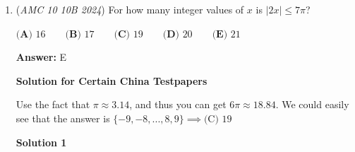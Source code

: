 \begin{enumerate}
Factoring out $7!$ gives 
 \[7!(10\cdot9\cdot8-1\cdot6!).\] Since $10\cdot9\cdot8=6!=720$, the answer is $\boxed{\text{(B) }0}$ 

 Factoring $6!$ also works, it just makes the expression in the parenthesis a little harder to compute.

 



\textbf{Solution 3}

Note that $10! - 7! \cdot 6!$ must be divisible by $7$, since 
 \[10! - 7! \cdot 6!=7!(10\cdot9\cdot8\cdot6!)=7\cdot(6!\cdot10\cdot9\cdot8\cdot6!)\] and $\boxed{\text{(B) }0}$ is the only option divisible by $7$.

 



\textbf{Solution 4}

$10! - 7! \cdot 6!$ can be split into two parts, $10!$ and $7! \cdot 6!$. We can break the $6!$ into $(2 \cdot 4)(3 \cdot 5 \cdot 6)$The $2 \cdot 4$ part makes $8$, and the $3 \cdot 5 \cdot 6$ part makes $90$, which is $9 \cdot 10$. We still have the 7!, and we can multiply it by $8 \cdot 9 \cdot 10$. This is clearly equivalent to $10!$, so our solution is $10! - 10! =$$\boxed{\text{(B) }0}$.

 



\textbf{Solution 5}

$10! = 3,628,800$, $7! = 5,040$, and $6! = 720$. $5,040 \cdot 720 = 3,628,800$. Therefore, $3,628,800 - 3,628,800 = \boxed{\text{(B) }0}$.

 -pepper2831

 -minor edits by blakezhang

 


	\item (\textit{AMC 10 10B 2024}) For how many integer values of $x$ is $|2x| \leq 7 \pi$?


 $\textbf{(A) } 16 \qquad\textbf{(B) } 17 \qquad\textbf{(C) } 19 \qquad\textbf{(D) } 20 \qquad\textbf{(E) } 21$

 \textbf{Answer: }E



\textbf{Solution for Certain China Testpapers}

Use the fact that $\pi \approx 3.14$, and thus you can get $6\pi \approx 18.84$. We could easily see that the answer is $\{-9,-8,...,8,9\}\implies\boxed{\text{(C) }19}$




\textbf{Solution 1}


\end{enumerate}
